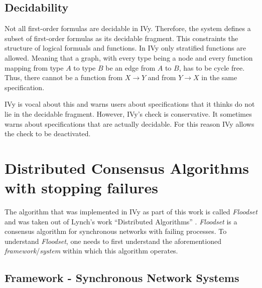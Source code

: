 \documentclass[fleqn]{article}
\begin{document}
\subsection{Decidability}
Not all first-order formulas are decidable in IVy. Therefore, the system defines a subset of first-order formulas as its decidable fragment.
This constraints the structure of logical formuals and functions. In IVy only stratified functions are allowed. Meaning that a graph,
with every type being a node and every function mapping from type $A$ to type $B$ be an edge from $A$ to $B$, has to be cycle free. Thus, there cannot be a function from
$X \rightarrow Y$ and from $Y \rightarrow X$ in the same specification.

IVy is vocal about this and warns users about specifications that it thinks do not lie in the decidable fragment.
However, IVy's check is conservative. It sometimes warns about specifications that are actually decidable. For this
reason IVy allows the check to be deactivated. \cite{decid}


\section{Distributed Consensus Algorithms with stopping failures}

The algorithm that was implemented in IVy as part of this work is called \textit{Floodset} and was taken out of Lynch's work ``Distributed Algorithms'' \cite{refNancy}.
\textit{Floodset} is a consensus algorithm for synchronous networks with failing processes.
To understand \textit{Floodset}, one needs to first understand the aforementioned \textit{framework}/\textit{system} within which this algorithm operates.

\subsection{Framework - Synchronous Network Systems}
\end{document}
